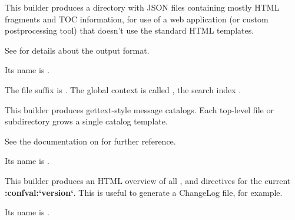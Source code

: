 \documentclass[letterpaper,10pt,english]{sphinxmanual}
\begin{document}

\begin{fulllineitems}
\label{builders:sphinx.builders.html.JSONHTMLBuilder}
This builder produces a directory with JSON files containing mostly HTML
fragments and TOC information, for use of a web application (or custom
postprocessing tool) that doesn't use the standard HTML templates.

See {\hyperref[builders:serialization\string-details]{}} for details about the output format.

Its name is .

The file suffix is .  The global context is called
, the search index .


\end{fulllineitems}

\label{builders:module-sphinx.builders.gettext}

\begin{fulllineitems}
\label{builders:sphinx.builders.gettext.MessageCatalogBuilder}
This builder produces gettext-style message catalogs.  Each top-level file or
subdirectory grows a single  catalog template.

See the documentation on {\hyperref[intl:intl]{}} for further reference.

Its name is .


\end{fulllineitems}

\label{builders:module-sphinx.builders.changes}

\begin{fulllineitems}
\label{builders:sphinx.builders.changes.ChangesBuilder}
This builder produces an HTML overview of all {\hyperref[markup/para:directive\string-versionadded]{}},
{\hyperref[markup/para:directive\string-versionchanged]{}} and {\hyperref[markup/para:directive\string-deprecated]{}} directives for the current
{\color{red}\bfseries{}:confval:{}`version{}`}.  This is useful to generate a ChangeLog file, for
example.

Its name is .

\end{fulllineitems}
\end{document}

